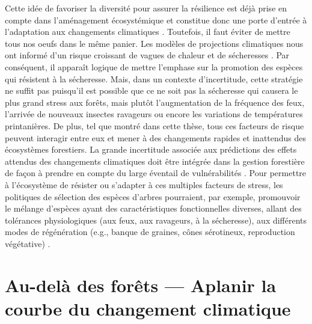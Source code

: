 Cette idée de favoriser la diversité pour assurer la résilience est déjà
prise en compte dans l'aménagement écosystémique et constitue donc une
porte d'entrée à l'adaptation aux changements climatiques
\citep{samuel_foret_2011}. Toutefois, il faut éviter de mettre tous nos
oeufs dans le même panier. Les modèles de projections climatiques nous
ont informé d'un risque croissant de vagues de chaleur et de sécheresses
\citep{ipcc_climate_2014}. Par conséquent, il apparaît logique de mettre
l'emphase sur la promotion des espèces qui résistent à la sécheresse.
Mais, dans un contexte d'incertitude, cette stratégie ne suffit pas
puisqu'il est possible que ce ne soit pas la sécheresse qui causera le
plus grand stress aux forêts, mais plutôt l'augmentation de la fréquence
des feux, l'arrivée de nouveaux insectes ravageurs ou encore les
variations de températures printanières. De plus, tel que montré dans
cette thèse, tous ces facteurs de risque peuvent interagir entre eux et
mener à des changements rapides et inattendus des écosystèmes
forestiers. La grande incertitude associée aux prédictions des effets
attendus des changements climatiques doit être intégrée dans la gestion
forestière de façon à prendre en compte du large éventail de
vulnérabilités \citep{messier_dealing_2016}. Pour permettre à
l'écosystème de résister ou s'adapter à ces multiples facteurs de
stress, les politiques de sélection des espèces d'arbres pourraient, par
exemple, promouvoir le mélange d'espèces ayant des caractéristiques
fonctionnelles diverses, allant des tolérances physiologiques (aux feux,
aux ravageurs, à la sécheresse), aux différents modes de régénération
(e.g., banque de graines, cônes sérotineux, reproduction végétative)
\citep{messier_functional_2019, puettmann_critique_2009}.

\hypertarget{au-deluxe0-des-foruxeats-aplanir-la-courbe-du-changement-climatique}{%
\section{Au-delà des forêts --- Aplanir la courbe du changement
climatique}\label{au-deluxe0-des-foruxeats-aplanir-la-courbe-du-changement-climatique}}

